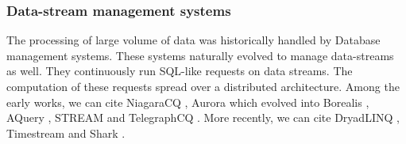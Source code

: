 
\subsubsection{Data-stream management systems}

The processing of large volume of data was historically handled by Database management systems.
These systems naturally evolved to manage data-streams as well.
They continuously run SQL-like requests on data streams.
The computation of these requests spread over a distributed architecture.
Among the early works, we can cite NiagaraCQ \cite{Chen2000,Naughton2001}, Aurora \cite{Abadi2003,Abadi2003a,Balakrishnan2004} which evolved into Borealis \cite{Abadi2005}, AQuery \cite{Lerner2003}, STREAM \cite{Arasu2003,Arasu2005} and TelegraphCQ \cite{Krishnamurthy2003,Chandrasekaran2003}.
More recently, we can cite DryadLINQ \cite{Isard2007,Yu2009}, Timestream \cite{Qian2013} and Shark \cite{Xin2013}.



